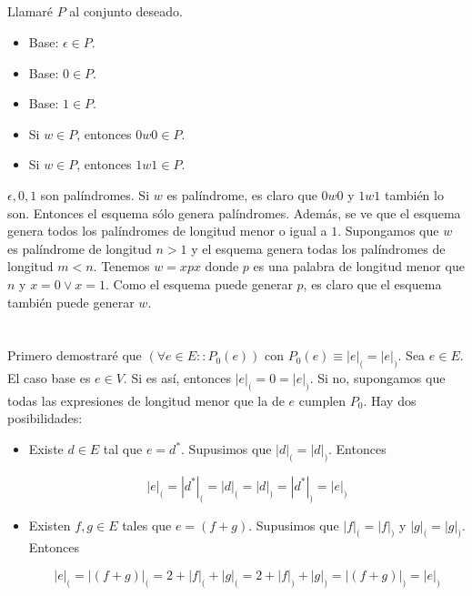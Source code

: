 \documentclass{article}
\begin{document}
\subsection{}

Llamaré $P$ al conjunto deseado.

\begin{itemize}
\item Base: $\epsilon \in P$.
\item Base: $0 \in P$.
\item Base: $1 \in P$.
\item Si $w \in P$, entonces $0w0 \in P$.
\item Si $w \in P$, entonces $1w1 \in P$.
\end{itemize}

$\epsilon, 0, 1$ son palíndromes. Si $w$ es palíndrome, es claro que $0w0$ y
$1w1$ también lo son. Entonces el esquema sólo genera palíndromes. Además, se ve
que el esquema genera todos los palíndromes de longitud menor o igual a $1$.
Supongamos que $w$ es palíndrome de longitud $n > 1$ y el esquema genera todas
los palíndromes de longitud $m < n$. Tenemos $w = xpx$ donde $p$ es
una palabra de longitud menor que $n$ y $x = 0 \vee x = 1$.
Como el esquema puede generar $p$, es claro que el esquema también puede generar
$w$.

\section{}

Primero demostraré que $(\forall e \in E :: P_0(e))$ con
$P_0(e) \equiv |e|_( = |e|_)$. Sea $e \in E$. El
caso base es $e \in V$. Si es así, entonces $|e|_( = 0 = |e|_)$. Si no,
supongamos que todas las expresiones de longitud menor que la de $e$ cumplen
$P_0$. Hay dos posibilidades:

\begin{itemize}
\item Existe $d \in E$ tal que $e = d^*$. Supusimos que $|d|_( = |d|_)$.
Entonces

$$|e|_( = |d^*|_( = |d|_( = |d|_) = |d^*|_) = |e|_)$$

\item Existen $f,g \in E$ tales que $e = (f+g)$. Supusimos que
$|f|_( = |f|_)$ y $|g|_( = |g|_)$. Entonces

$$
|e|_( = |(f+g)|_( = 2 + |f|_( + |g|_( = 2 + |f|_) + |g|_) = |(f+g)|_) = |e|_)
$$

\end{itemize}
\end{document}
